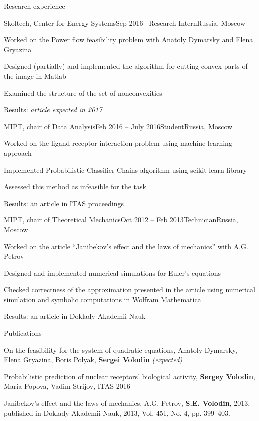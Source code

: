 \documentclass{resume} %
\begin{document}
\begin{rSection}{Research experience}
	\begin{rSubsection}{Skoltech, Center for Energy Systems}{Sep 2016 --}{Research Intern}{Russia, Moscow}
		\item Worked on the Power flow feasibility problem with Anatoly Dymarsky and Elena Gryazina
		\item Designed (partially) and implemented the algorithm for cutting convex parts of the image in Matlab
		\item Examined the structure of the set of nonconvexities
		\item Results: \em article expected in 2017
	\end{rSubsection}
	
	\begin{rSubsection}{MIPT, chair of Data Analysis}{Feb 2016 -- July 2016}{Student}{Russia, Moscow}
		\item Worked on the ligand-receptor interaction problem using machine learning approach
		\item Implemented Probabilistic Classifier Chains algorithm using scikit-learn library
		\item Assessed this method as infeasible for the task
		\item Results: an article in ITAS proceedings
	\end{rSubsection}
	
	\begin{rSubsection}{MIPT, chair of Theoretical Mechanics}{Oct 2012 -- Feb 2013}{Technician}{Russia, Moscow}
		\item Worked on the article ``Janibekov's effect and the laws of mechanics'' with A.G. Petrov
		\item Designed and implemented numerical simulations for Euler's equations
		\item Checked correctness of the approximation presented in the article using numerical simulation and symbolic computations in Wolfram Mathematica
		\item Results: an article in Doklady Akademii Nauk
	\end{rSubsection}
\end{rSection}


\begin{rSection}{Publications}
\item On the feasibility for the system of quadratic equations, Anatoly Dymarsky, Elena Gryazina, Boris Polyak, {\bf Sergei Volodin} {\em (expected)}
\item Probabilistic prediction of nuclear receptors’ biological activity, {\bf Sergey Volodin}, Maria Popova, Vadim Strijov, ITAS 2016
\item Janibekov’s effect and the laws of mechanics, A.G. Petrov, {\bf S.E. Volodin}, 2013, published in Doklady Akademii Nauk, 2013, Vol. 451, No. 4, pp. 399–403.
\end{rSection}
\end{document}
